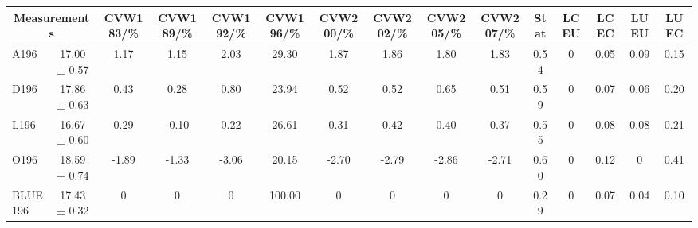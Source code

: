 \begin{table}[H]
\scriptsize
\begin{center}
\renewcommand{\arraystretch}{1.1}
\begin{tabular}{|lc|c|c|c|c|c|c|c|c|ccccc|}
\hline
\multicolumn{2}{|c|}{Measurements} & CVW{\tiny 183}/\%  & CVW{\tiny 189}/\%  & CVW{\tiny 192}/\%  & CVW{\tiny 196}/\%  & CVW{\tiny 200}/\%  & CVW{\tiny 202}/\%  & CVW{\tiny 205}/\%  & CVW{\tiny 207}/\%  & {\tiny Stat} & {\tiny LCEU} & {\tiny LCEC} & {\tiny LUEU} & {\tiny LUEC}\\
\hline
A196 &      17.00 $\pm$       0.57 &       1.17 &       1.15 &       2.03 &      29.30 &       1.87 &       1.86 &       1.80 &       1.83 &       0.54 &  0 &       0.05 &       0.09 &       0.15\\
D196 &      17.86 $\pm$       0.63 &       0.43 &       0.28 &       0.80 &      23.94 &       0.52 &       0.52 &       0.65 &       0.51 &       0.59 &  0 &       0.07 &       0.06 &       0.20\\
L196 &      16.67 $\pm$       0.60 &       0.29 &      -0.10 &       0.22 &      26.61 &       0.31 &       0.42 &       0.40 &       0.37 &       0.55 &  0 &       0.08 &       0.08 &       0.21\\
O196 &      18.59 $\pm$       0.74 &      -1.89 &      -1.33 &      -3.06 &      20.15 &      -2.70 &      -2.79 &      -2.86 &      -2.71 &       0.60 &  0 &       0.12 &  0 &       0.41\\
\hline
BLUE {\tiny 196} &      17.43 $\pm$       0.32 &  0 &  0 &  0 &     100.00 &  0 &  0 &  0 &  0 &       0.29 &  0 &       0.07 &       0.04 &       0.10\\
\hline
\end{tabular}
\renewcommand{\arraystretch}{1}
\end{center}
\end{table}
\vspace*{-0.5cm}
